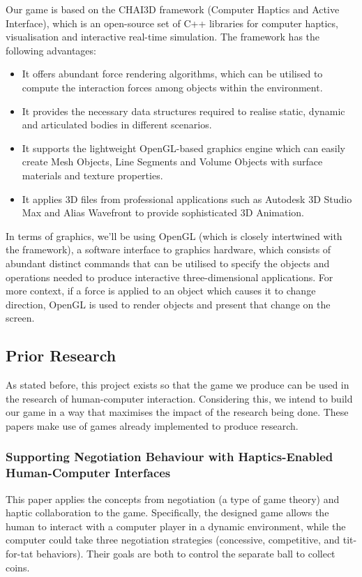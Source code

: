 \documentclass[a4paper]{article}
\begin{document}
Our game is based on the CHAI3D framework (Computer Haptics and Active Interface), which is an open-source set of C++ libraries for computer haptics, visualisation and interactive real-time simulation. The framework has the following advantages:
\begin{itemize}
    \item It offers abundant force rendering algorithms, which can be utilised to compute the interaction forces among objects within the environment.
    \item It provides the necessary data structures required to realise static, dynamic and articulated bodies in different scenarios.
    \item It supports the lightweight OpenGL-based graphics engine which can easily create Mesh Objects, Line Segments and Volume Objects with surface materials and texture properties.
    \item It applies 3D files from professional applications such as Autodesk 3D Studio Max and Alias Wavefront to provide sophisticated 3D Animation.
\end{itemize}

In terms of graphics, we’ll be using OpenGL (which is closely intertwined with the framework), a software interface to graphics hardware, which consists of abundant distinct commands that can be utilised to specify the objects and operations needed to produce interactive three-dimensional applications. For more context, if a force is applied to an object which causes it to change direction, OpenGL is used to render objects and present that change on the screen.

\subsection{Prior Research}
As stated before, this project exists so that the game we produce can be used in the research of human-computer interaction. Considering this, we intend to build our game in a way that maximises the impact of the research being done. These papers make use of games already implemented to produce research.

\subsubsection*{Supporting Negotiation Behaviour with Haptics-Enabled Human-Computer Interfaces \cite{oguz2012supporting}}
This paper applies the concepts from negotiation (a type of game theory) and haptic collaboration to the game. Specifically, the designed game allows the human to interact with a computer player in a dynamic environment, while the computer could take three negotiation strategies (concessive, competitive, and tit-for-tat behaviors). Their goals are both to control the separate ball to collect coins.
\end{document}
